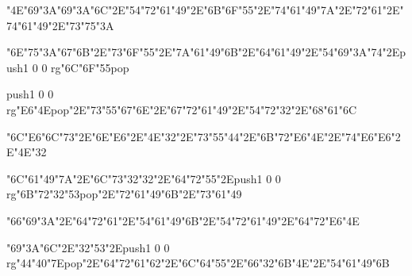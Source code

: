 \centerline{\ipa\char"4E\ipa\char"69\ipa\char"3A\ipa\char"69\ipa\char"3A\ipa\char"6C\ipa\char"2E\ipa\char"54\ipa\char"72\ipa\char"61\ipa\char"49\ipa\char"2E\ipa\char"6B\ipa\char"6F\ipa\char"55\ipa\char"2E\ipa\char"74\ipa\char"61\ipa\char"49\ipa\char"7A\ipa\char"2E\ipa\char"72\ipa\char"61\ipa\char"2E\ipa\char"74\ipa\char"61\ipa\char"49\ipa\char"2E\ipa\char"73\ipa\char"75\ipa\char"3A}\bigskip
\centerline{\ipa\char"6E\ipa\char"75\ipa\char"3A\ipa\char"67\ipa\char"6B\ipa\char"2E\ipa\char"73\ipa\char"6F\ipa\char"55\ipa\char"2E\ipa\char"7A\ipa\char"61\ipa\char"49\ipa\char"6B\ipa\char"2E\ipa\char"64\ipa\char"61\ipa\char"49\ipa\char"2E\ipa\char"54\ipa\char"69\ipa\char"3A\ipa\char"74\ipa\char"2E\pdfcolorstack\match push{1 0 0 rg}\ipa\char"6C\ipa\char"6F\ipa\char"55\pdfcolorstack\match pop{}}
\vfill\eject
\null\vfill
\centerline{\pdfcolorstack\match push{1 0 0 rg}\ipa\char"E6\ipa\char"4E\pdfcolorstack\match pop{}\ipa\char"2E\ipa\char"73\ipa\char"55\ipa\char"67\ipa\char"6E\ipa\char"2E\ipa\char"67\ipa\char"72\ipa\char"61\ipa\char"49\ipa\char"2E\ipa\char"54\ipa\char"72\ipa\char"32\ipa\char"2E\ipa\char"68\ipa\char"61\ipa\char"6C}\bigskip
\centerline{\ipa\char"6C\ipa\char"E6\ipa\char"6C\ipa\char"73\ipa\char"2E\ipa\char"6E\ipa\char"E6\ipa\char"2E\ipa\char"4E\ipa\char"32\ipa\char"2E\ipa\char"73\ipa\char"55\ipa\char"44\ipa\char"2E\ipa\char"6B\ipa\char"72\ipa\char"E6\ipa\char"4E\ipa\char"2E\ipa\char"74\ipa\char"E6\ipa\char"E6\ipa\char"2E\ipa\char"4E\ipa\char"32}\bigskip
\centerline{\ipa\char"6C\ipa\char"61\ipa\char"49\ipa\char"7A\ipa\char"2E\ipa\char"6C\ipa\char"73\ipa\char"32\ipa\char"32\ipa\char"2E\ipa\char"64\ipa\char"72\ipa\char"55\ipa\char"2E\pdfcolorstack\match push{1 0 0 rg}\ipa\char"6B\ipa\char"72\ipa\char"32\ipa\char"53\pdfcolorstack\match pop{}\ipa\char"2E\ipa\char"72\ipa\char"61\ipa\char"49\ipa\char"6B\ipa\char"2E\ipa\char"73\ipa\char"61\ipa\char"49}
\vfill\eject
\null\vfill
\centerline{\ipa\char"66\ipa\char"69\ipa\char"3A\ipa\char"2E\ipa\char"64\ipa\char"72\ipa\char"61\ipa\char"2E\ipa\char"54\ipa\char"61\ipa\char"49\ipa\char"6B\ipa\char"2E\ipa\char"54\ipa\char"72\ipa\char"61\ipa\char"49\ipa\char"2E\ipa\char"64\ipa\char"72\ipa\char"E6\ipa\char"4E}\bigskip
\centerline{\ipa\char"69\ipa\char"3A\ipa\char"6C\ipa\char"2E\ipa\char"32\ipa\char"53\ipa\char"2E\pdfcolorstack\match push{1 0 0 rg}\ipa\char"44\ipa\char"40\ipa\char"7E\pdfcolorstack\match pop{}\ipa\char"2E\ipa\char"64\ipa\char"72\ipa\char"61\ipa\char"62\ipa\char"2E\ipa\char"6C\ipa\char"64\ipa\char"55\ipa\char"2E\ipa\char"66\ipa\char"32\ipa\char"6B\ipa\char"4E\ipa\char"2E\ipa\char"54\ipa\char"61\ipa\char"49\ipa\char"6B}\bigskip
